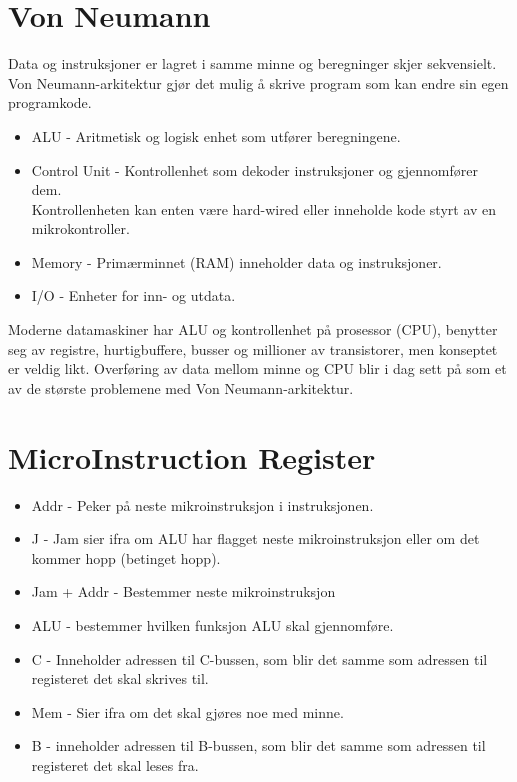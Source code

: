 \documentclass[a4paper, 10pt]{article}
\begin{document}
\section{Von Neumann}
Data og instruksjoner er lagret i samme minne og beregninger skjer sekvensielt. Von Neumann-arkitektur gjør det mulig å skrive program som kan endre sin egen programkode.

\begin{itemize}
	\item ALU - Aritmetisk og logisk enhet som utfører beregningene.
	\item Control Unit - Kontrollenhet som dekoder instruksjoner og gjennomfører dem. \\ Kontrollenheten kan enten være hard-wired eller inneholde kode styrt av en mikrokontroller.
	\item Memory - Primærminnet (RAM) inneholder data og instruksjoner.
	\item I/O - Enheter for inn- og utdata.
	
\end{itemize}

Moderne datamaskiner har ALU og kontrollenhet på prosessor (CPU), benytter seg av registre, hurtigbuffere, busser og millioner av transistorer, men konseptet er veldig likt. Overføring av data mellom minne og CPU blir i dag sett på som et av de største problemene med Von Neumann-arkitektur.

\section{MicroInstruction Register}
\begin{itemize}
	\item Addr - Peker på neste mikroinstruksjon i instruksjonen.
	\item J - Jam sier ifra om ALU har flagget neste mikroinstruksjon eller om det kommer hopp (betinget hopp).
	\item Jam + Addr - Bestemmer neste mikroinstruksjon
	\item ALU - bestemmer hvilken funksjon ALU skal gjennomføre.
	\item C - Inneholder adressen til C-bussen, som blir det samme som adressen til registeret det skal skrives til. 
	\item Mem - Sier ifra om det skal gjøres noe med minne.
	\item B - inneholder adressen til B-bussen, som blir det samme som adressen til registeret det skal leses fra.
\end{itemize}
\end{document}
